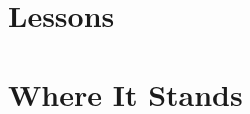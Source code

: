 \documentclass[11pt]{book}
\theoremstyle{definition}
\theoremstyle{remark}
\begin{document}
\part{Lessons}



\part{Where It Stands}


\appendix




\backmatter

\end{document}
